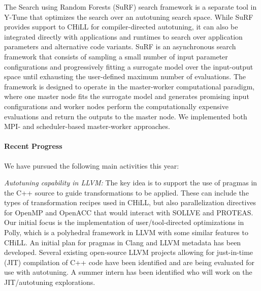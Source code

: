 The Search using Random Forests (SuRF) search framework is a separate tool in Y-Tune that optimizes the search over an autotuning search space.  While
SuRF provides support to CHiLL for compiler-directed autotuning, it can
also be integrated directly with applications and runtimes to search over
application parameters and alternative code variants.
SuRF is an asynchronous search framework that consists of sampling a small number of input parameter configurations and progressively fitting a surrogate model over the input-output space until exhausting the user-defined maximum number of evaluations. The framework is designed to operate in the master-worker computational paradigm, where one master node fits the surrogate model and generates promising input configurations and worker nodes perform the computationally expensive evaluations and return the outputs to the master node. We implemented both MPI- and scheduler-based master-worker approaches.


\paragraph{Recent Progress}


We have pursued the following main activities this year:

\textit{Autotuning capability in LLVM:}
The key idea is to support the use of pragmas in the C++ source to guide transformations to be applied. These can include the types of transformation recipes used in CHiLL, but also parallelization directives for OpenMP and OpenACC that would interact with SOLLVE and PROTEAS. Our initial focus is the implementation of user/tool-directed optimizations in Polly, which is a polyhedral framework in LLVM with some similar features to CHiLL. An initial plan for pragmas in Clang and LLVM metadata has been developed. Several existing open-source LLVM projects allowing for just-in-time (JIT) compilation of C++ code have been identified and are being evaluated for use with autotuning. A summer intern has been identified who will work on the JIT/autotuning explorations.

